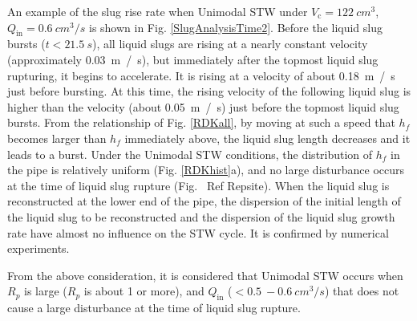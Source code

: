 \documentclass[aps,pre,preprint,groupedaddress,showkeys]{revtex4-2}
\begin{document}
An example of the slug rise rate when Unimodal STW under $ V_ \mathrm {c} =\SI{122}{cm ^ 3} $, $ Q_ \mathrm {in} = \SI{0.6}{cm ^ 3/ s }$  is shown in Fig. \ref{SlugAnalysisTime2}.
Before the liquid slug bursts ($ t < \SI{21.5}{s}$), all liquid slugs are rising at a nearly constant velocity (approximately \SI{0.03}{ m / s}), but immediately after the topmost liquid slug rupturing, it begins to accelerate. 
It is rising at a velocity of about \SI{0.18}{ m / s} just before bursting.
At this time, the rising velocity of the following liquid slug is higher than the velocity (about \SI{0.05}{ m / s}) just before the topmost liquid slug bursts.
From the relationship of Fig. \ref{RDKall}, by moving at such a speed that $h_f $ becomes larger than $ h_f $ immediately above, the liquid slug length decreases and it leads to a burst.
Under the Unimodal STW conditions, the distribution of $ h_f $ in the pipe is relatively uniform (Fig. \ref{RDKhist}a), and no large disturbance occurs at the time of liquid slug rupture (Fig. \ Ref {Repsite}).
When the liquid slug is reconstructed at the lower end of the pipe, the dispersion of the initial length of the liquid slug to be reconstructed and the dispersion of the liquid slug growth rate have almost no influence on the STW cycle. 
It is confirmed by numerical experiments.

From the above consideration, it is considered that Unimodal STW occurs when $ R_p $ is large ($ R_p $ is about 1 or more), and $ Q_ \mathrm {in} $ ($< \SI{0.5}{} - \SI{0.6}{cm^3/s}$) that does not cause a large disturbance at the time of liquid slug rupture.
\end{document}
